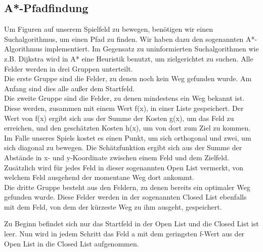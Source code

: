 \documentclass[extern,palatino]{cgBA}
\begin{document}
\subsection{A*-Pfadfindung}\label{Pfadfindung}
Um Figuren auf unserem Spielfeld zu bewegen, benötigen wir einen Suchalgorithmus, um einen Pfad zu finden. Wir haben dazu den sogenannten A*-Algorithmus implementiert. Im Gegensatz zu uninformierten Suchalgorithmen wie z.B. Dijkstra wird in A* eine Heuristik benutzt, um zielgerichtet zu suchen. Alle Felder werden in drei Gruppen unterteilt. \\Die erste Gruppe sind die Felder, zu denen noch kein Weg gefunden wurde. Am Anfang sind dies alle außer dem Startfeld. \\Die zweite Gruppe sind die Felder, zu denen mindestens ein Weg bekannt ist. Diese werden, zusammen mit einem Wert f(x), in einer Liste gespeichert. Der Wert von f(x) ergibt sich aus der Summe der Kosten g(x), um das Feld zu erreichen, und den geschätzten Kosten h(x), um von dort zum Ziel zu kommen. Im Falle unseres Spiels kostet es einen Punkt, um sich orthogonal und zwei, um sich diagonal zu bewegen. Die Schätzfunktion ergibt sich aus der Summe der Abstände in x- und y-Koordinate zwischen einem Feld und dem Zielfeld. Zusätzlich wird für jedes Feld in dieser sogenannten Open List vermerkt, von welchem Feld ausgehend der momentane Weg dort ankommt. \\Die dritte Gruppe besteht aus den Feldern, zu denen bereits ein optimaler Weg gefunden wurde. Diese Felder werden in der sogenannten Closed List ebenfalls mit dem Feld, von dem der kürzeste Weg zu ihm ausgeht, gespeichert.
	
Zu Beginn befindet sich nur das Startfeld in der Open List und die Closed List ist leer. Nun wird in jedem Schritt das Feld a mit dem geringsten f-Wert aus der Open List in die Closed List aufgenommen. 
	
\end{document}
